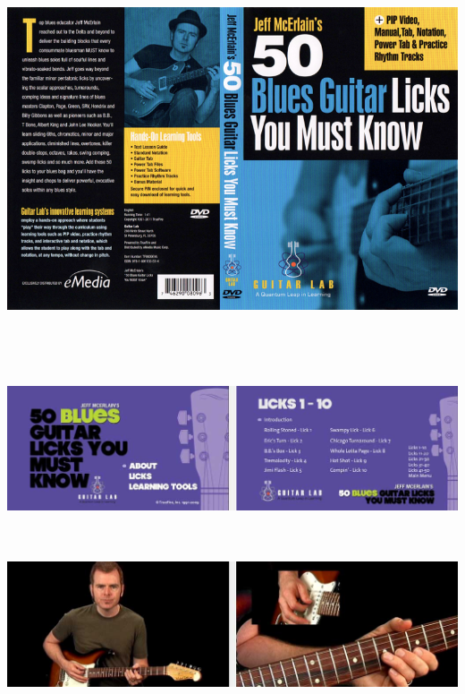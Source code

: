 \documentclass[a4paper]{book}
\begin{document}
\begin{center}
\includegraphics[width=17cm,height=11.43cm]{lebluessupportsmethodes-img75.jpg}
\end{center}


\begin{center}
\includegraphics[width=17cm,height=4.697cm]{lebluessupportsmethodes-img76.jpg}
\end{center}


\begin{center}
\includegraphics[width=17cm,height=4.715cm]{lebluessupportsmethodes-img77.jpg}
\end{center}
\end{document}
